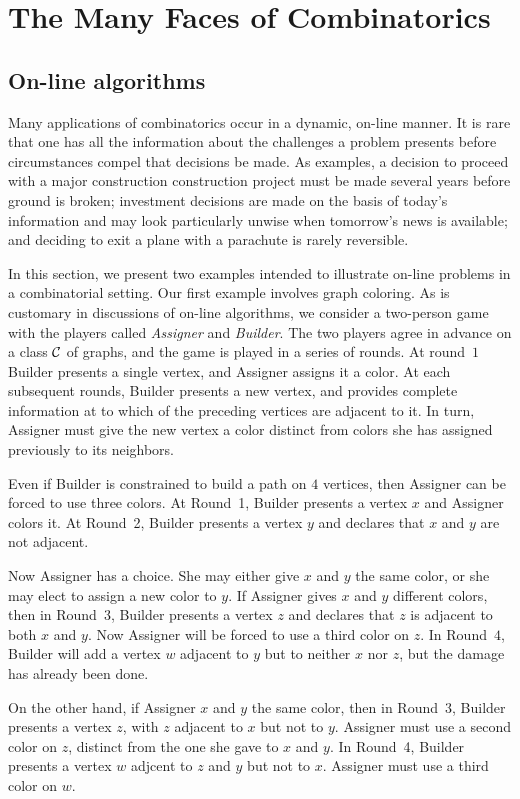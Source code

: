 
\chapter{The Many Faces of Combinatorics}\label{ch:kitchensink}

\section{On-line algorithms}\label{s:kitchensink:online}

Many applications of combinatorics occur in a dynamic, on-line
manner.  It is rare that one has all the information about the
challenges a problem presents before circumstances compel that
decisions be made.  As examples, a decision to proceed with a
major construction construction project must be made several
years before ground is broken; investment decisions are made
on the basis of today's information and may look particularly
unwise when tomorrow's news is available; and deciding to
exit a plane with a parachute is rarely reversible.

In this section, we present two examples intended to illustrate
on-line problems in a combinatorial setting.  Our first example
involves graph coloring.  As is customary in discussions of 
on-line algorithms, we consider a two-person game with the players
called \textit{Assigner} and \textit{Builder}.  The two players
agree in advance on a class $\mathcal{C}$ of graphs, and the game
is played in a series of rounds.  At round~$1$ Builder presents
a single vertex, and Assigner assigns it a color.  At each
subsequent rounds, Builder presents a new vertex, and provides 
complete information at to which of the preceding vertices are 
adjacent to it.  In turn, Assigner must give the new vertex a 
color distinct from colors she has assigned previously to its 
neighbors.

\begin{example}\label{exa:P4}
Even if Builder is constrained to build a path on $4$ vertices,
then Assigner can be forced to use three colors.
At Round~1, Builder presents a vertex $x$ and Assigner colors 
it.  At Round~2, Builder presents a vertex $y$ and declares that 
$x$ and $y$ are not adjacent.

Now Assigner has a choice.  She may either give $x$ and $y$ the
same color, or she may elect to assign a new color to $y$.
If Assigner gives $x$ and $y$ different colors, then in Round~3, 
Builder presents a vertex $z$ and declares that $z$ is adjacent to 
both $x$ and $y$.  Now  Assigner will be forced to use a third 
color on $z$.  In Round~$4$, Builder will add a vertex $w$ adjacent
to $y$ but to neither $x$ nor $z$, but the damage has already been
done.

On the other hand, if Assigner $x$ and $y$ the same color, then 
in Round~3, Builder presents a vertex $z$, with $z$ adjacent to 
$x$ but not to $y$.  Assigner must use a second color on $z$, 
distinct from the one she gave to $x$ and $y$.  In Round~4, Builder 
presents a vertex $w$ adjcent to $z$ and $y$ but not to $x$.  Assigner 
must use a third color on $w$.  
\end{example}

